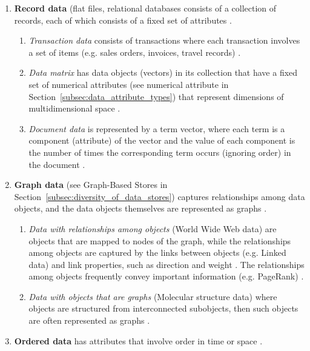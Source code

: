 			    \begin{enumerate}
    				\item \textbf{Record data} (flat files, relational databases  consists of a collection of records, each of which consists of a fixed set of attributes \cite{Tan2013}.
    				\begin{enumerate}
    					\item \textit{Transaction data} consists of transactions where each transaction involves a set of items (e.g. sales orders, invoices, travel records) \cite{Tan2013}. 
    					\item \textit{Data matrix} has data objects (vectors) in its collection that have a fixed set of numerical attributes (see numerical attribute in Section~\ref{subsec:data_attribute_types}) that represent dimensions of multidimensional space \cite{Tan2013}.
    					\item \textit{Document data} is represented by a term vector, where each term is a component (attribute) of the vector and the value of each component is the number of times the corresponding term occurs (ignoring order) in the document \cite{Tan2013}.
    				\end{enumerate}
    				\item \textbf{Graph data} (see Graph-Based Stores in Section~\ref{subsec:diversity_of_data_stores}) captures relationships among data objects, and the data objects themselves are represented as graphs \cite{Tan2013}.
    				\begin{enumerate}
    					\item \textit{Data with relationships among objects} (World Wide Web data) are objects that are mapped to nodes of the graph, while the relationships among objects are captured by the links between objects (e.g. Linked data) and link properties, such as direction and weight \cite{Tan2013}. The relationships among objects frequently convey important information (e.g. PageRank) \cite{Tan2013}.
    					\item \textit{Data with objects that are graphs} (Molecular structure data) where objects are structured from interconnected subobjects, then such objects are often represented as graphs \cite{Tan2013}.
    				\end{enumerate}
    				\item \textbf{Ordered data}  has attributes that involve order in time or space \cite{Tan2013}.
    				\begin{enumerate}

\end{enumerate}
\end{enumerate}
